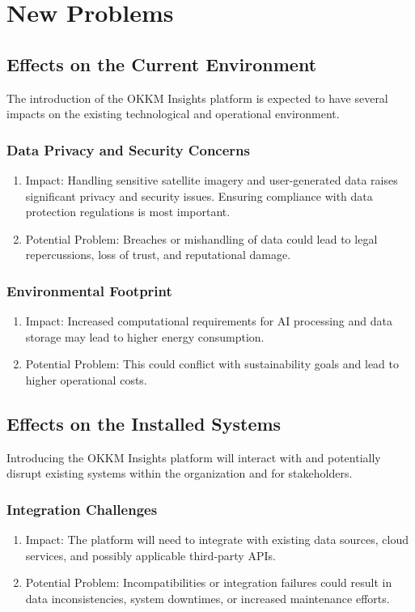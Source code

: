 \documentclass[12pt]{article}
\begin{document}
\section{New Problems}
\subsection{Effects on the Current Environment}
The introduction of the OKKM Insights platform is expected to have several impacts on the existing technological and operational environment.
\subsubsection{Data Privacy and Security Concerns}
\begin{enumerate}
    \item Impact: Handling sensitive satellite imagery and user-generated data raises significant privacy and security issues. Ensuring compliance with data protection regulations is most important.
    \item Potential Problem: Breaches or mishandling of data could lead to legal repercussions, loss of trust, and reputational damage.
\end{enumerate}
\subsubsection{Environmental Footprint}
\begin{enumerate}
    \item Impact: Increased computational requirements for AI processing and data storage may lead to higher energy consumption.
    \item Potential Problem: This could conflict with sustainability goals and lead to higher operational costs.
\end{enumerate}
\subsection{Effects on the Installed Systems}
Introducing the OKKM Insights platform will interact with and potentially disrupt existing systems within the organization and for stakeholders.
\subsubsection{Integration Challenges}
\begin{enumerate}
    \item Impact: The platform will need to integrate with existing data sources, cloud services, and possibly applicable third-party APIs.
    \item Potential Problem: Incompatibilities or integration failures could result in data inconsistencies, system downtimes, or increased maintenance efforts.
\end{enumerate}
\end{document}
